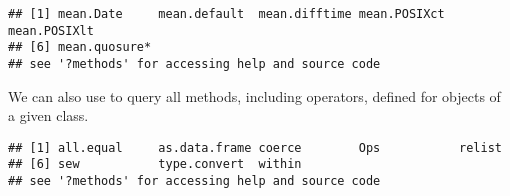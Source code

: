 \documentclass[krantz2]{krantz}\usepackage{knitr}
\begin{document}
\begin{knitrout}\footnotesize
{}\color{fgcolor}\begin{kframe}
\begin{alltt}
\end{alltt}
\begin{verbatim}
## [1] mean.Date     mean.default  mean.difftime mean.POSIXct  mean.POSIXlt 
## [6] mean.quosure*
## see '?methods' for accessing help and source code
\end{verbatim}
\end{kframe}
\end{knitrout}

We can also use  to query all methods, including operators, defined for objects of a given class.

\begin{knitrout}\footnotesize
{}\color{fgcolor}\begin{kframe}
\begin{alltt}
\hlstd{(} \hlstd{=} \hlstd{)}
\end{alltt}
\begin{verbatim}
## [1] all.equal     as.data.frame coerce        Ops           relist       
## [6] sew           type.convert  within       
## see '?methods' for accessing help and source code
\end{verbatim}
\end{kframe}
\end{knitrout}
\end{document}
